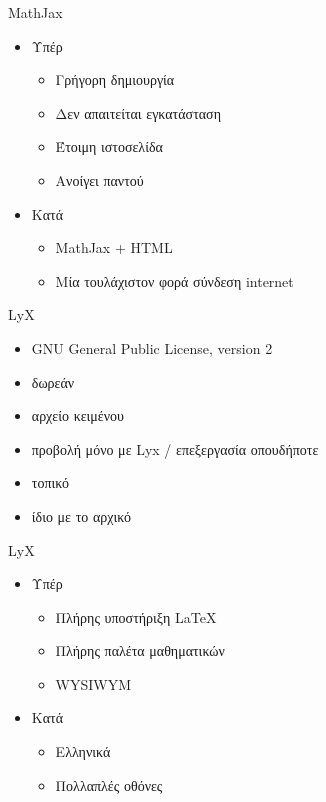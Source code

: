 \documentclass[greek]{beamer}
\begin{document}
\begin{frame}{MathJax}
  \begin{itemize}
    \item Υπέρ
      \begin{itemize}
        \item<2-> Γρήγορη δημιουργία
        \item<3-> Δεν απαιτείται εγκατάσταση
        \item<4-> Έτοιμη ιστοσελίδα
        \item<5-> Ανοίγει παντού
      \end{itemize}
    \item Κατά
      \begin{itemize}
        \item<6-> MathJax + HTML
        \item<7-> Μία τουλάχιστον φορά σύνδεση internet
      \end{itemize}
  \end{itemize}
\end{frame}

\begin{frame}{LyX}
  \begin{itemize}
    \item GNU General Public License, version 2
    \item δωρεάν
    \item αρχείο κειμένου
    \item προβολή μόνο με Lyx / επεξεργασία οπουδήποτε
    \item τοπικό
    \item ίδιο με το αρχικό
  \end{itemize}
\end{frame}

\begin{frame}{LyX}
  \begin{itemize}
    \item Υπέρ
      \begin{itemize}
        \item<2-> Πλήρης υποστήριξη \LaTeX
        \item<3-> Πλήρης παλέτα μαθηματικών
        \item<4-> WYSIWYM
      \end{itemize}
    \item Κατά
      \begin{itemize}
        \item<6-> Ελληνικά
        \item<7-> Πολλαπλές οθόνες
      \end{itemize}
  \end{itemize}
\end{frame}
\end{document}
